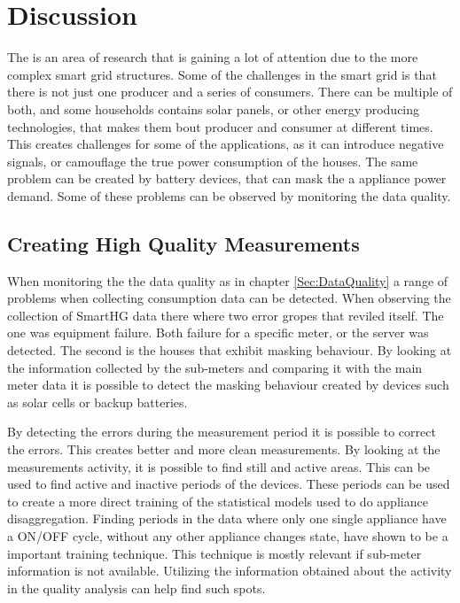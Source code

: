 \chapter{Discussion}

The  is an area of research that is gaining a lot of attention due to the more complex smart grid structures. Some of the challenges in the smart grid is that there is not just one producer and a series of consumers. There can be multiple of both, and some households contains solar panels, or other energy producing technologies, that makes them bout producer and consumer at different times. This creates challenges for some of the  applications, as it can introduce negative signals, or camouflage the true power consumption of the houses. The same problem can be created by battery devices, that can mask the a appliance power demand. Some of these problems can be observed by monitoring the data quality.

\section{Creating High Quality Measurements}
When monitoring the the data quality as in chapter \ref{Sec:DataQuality} a range of problems when collecting consumption data can be detected. When observing the collection of SmartHG data there where two error gropes that reviled itself. The one was equipment failure. Both failure for a specific meter, or the server was detected. The second is the houses that exhibit masking behaviour. By looking at the information collected by the sub-meters and comparing it with the main meter data it is possible to detect the masking behaviour created by devices such as solar cells or backup batteries. 

By detecting the errors during the measurement period it is possible to correct the errors. This creates better and more clean measurements. By looking at the measurements activity, it is possible to find still and active areas. This can be used to find active and inactive periods of the devices. These periods can be used to create a more direct training of the statistical models used to do appliance disaggregation. Finding periods in the data where only one single appliance have a ON/OFF cycle, without any other appliance changes state, have shown to be a important training technique. This technique is mostly relevant if sub-meter information is not available. Utilizing the information obtained about the activity in the quality analysis can help find such spots.

